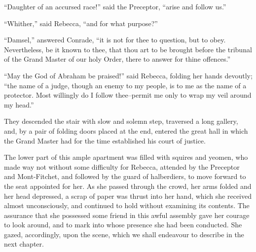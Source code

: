 ``Daughter of an accursed race!'' said the Preceptor, ``arise and follow
us.''

``Whither,'' said Rebecca, ``and for what purpose?''

``Damsel,'' answered Conrade, ``it is not for thee to question, but to
obey. Nevertheless, be it known to thee, that thou art to be brought
before the tribunal of the Grand Master of our holy Order, there to
answer for thine offences.''

``May the God of Abraham be praised!'' said Rebecca, folding her hands
devoutly; ``the name of a judge, though an enemy to my people, is to me
as the name of a protector. Most willingly do I follow thee--permit me
only to wrap my veil around my head.''

They descended the stair with slow and solemn step, traversed a long
gallery, and, by a pair of folding doors placed at the end, entered the
great hall in which the Grand Master had for the time established his
court of justice.

The lower part of this ample apartment was filled with squires and
yeomen, who made way not without some difficulty for Rebecca, attended
by the Preceptor and Mont-Fitchet, and followed by the guard of
halberdiers, to move forward to the seat appointed for her. As she
passed through the crowd, her arms folded and her head depressed, a
scrap of paper was thrust into her hand, which she received almost
unconsciously, and continued to hold without examining its contents. The
assurance that she possessed some friend in this awful assembly gave her
courage to look around, and to mark into whose presence she had been
conducted. She gazed, accordingly, upon the scene, which we shall
endeavour to describe in the next chapter.

